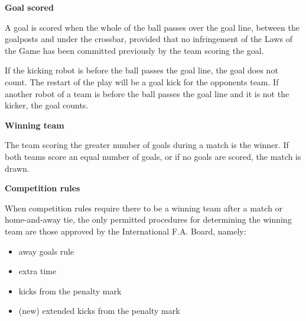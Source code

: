 \clearpage
\sffamily
{\bfseries\color[rgb]{0.4,0.4,0.4}{Law 10 -- The Method of Scoring} }
{}

\bigskip

{\bfseries Goal scored }

\headlinebox

A goal is scored when the whole of the ball passes over the goal line,
between the goalposts and under the crossbar,
provided that no infringement of the Laws of the Game has been committed
previously by the team scoring the goal.

\bigskip

If the kicking robot is   before the ball passes the goal line,
 the goal does not count.
The restart of the play will be a goal kick for the opponents team.
If another robot of a team is   before the ball
passes the goal line and it is not the kicker,  the goal counts.

\bigskip

{\bfseries Winning team}

\headlinebox

The team scoring the greater number of goals during a match is the winner. If both teams score an equal number of goals, or if no goals are scored, the match is drawn. 

\bigskip

{\bfseries Competition rules }

\headlinebox

When competition rules require there to be a winning team after a match or home-and-away tie, the only permitted procedures for determining the winning team are those approved by the International F.A. Board, namely:

\begin{itemize}
\item away goals rule
\item extra time
\item kicks from the penalty mark
\item (new) extended kicks from the penalty mark
\end{itemize}


{\bfseries {}}

\headlinebox

